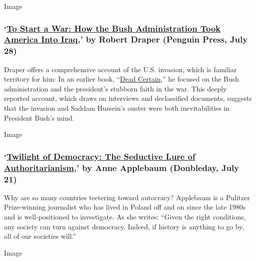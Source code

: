 Image

\hypertarget{to-start-a-war-how-the-bush-administration-took-america-into-iraq-by-robert-draper-penguin-press-july-28}{%
\subsubsection{\texorpdfstring{`\href{https://www.penguinrandomhouse.com/books/592622/to-start-a-war-by-robert-draper/}{To
Start a War: How the Bush Administration Took America Into Iraq},' by
Robert Draper (Penguin Press, July
28)}{`To Start a War: How the Bush Administration Took America Into Iraq,' by Robert Draper (Penguin Press, July 28)}}\label{to-start-a-war-how-the-bush-administration-took-america-into-iraq-by-robert-draper-penguin-press-july-28}}

Draper offers a comprehensive account of the U.S. invasion, which is
familiar territory for him: In an earlier book,
``\href{https://www.nytimes3xbfgragh.onion/2007/11/04/books/review/Lewis3-t.html}{Dead
Certain},'' he focused on the Bush administration and the president's
stubborn faith in the war. This deeply reported account, which draws on
interviews and declassified documents, suggests that the invasion and
Saddam Hussein's ouster were both inevitabilities in President Bush's
mind.

Image

\hypertarget{twilight-of-democracy-the-seductive-lure-of-authoritarianism-by-anne-applebaum-doubleday-july-21}{%
\subsubsection{\texorpdfstring{`\href{https://www.penguinrandomhouse.com/books/621076/twilight-of-democracy-by-anne-applebaum/}{Twilight
of Democracy: The Seductive Lure of Authoritarianism},' by Anne
Applebaum (Doubleday, July
21)}{`Twilight of Democracy: The Seductive Lure of Authoritarianism,' by Anne Applebaum (Doubleday, July 21)}}\label{twilight-of-democracy-the-seductive-lure-of-authoritarianism-by-anne-applebaum-doubleday-july-21}}

Why are so many countries teetering toward autocracy? Applebaum is a
Pulitzer Prize-winning journalist who has lived in Poland off and on
since the late 1980s and is well-positioned to investigate. As she
writes: ``Given the right conditions, any society can turn against
democracy. Indeed, if history is anything to go by, all of our societies
will.''

Image

